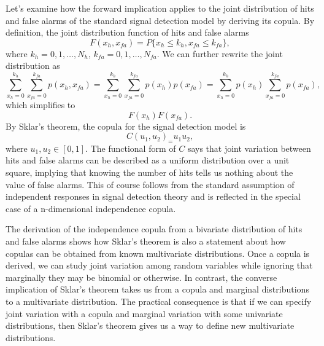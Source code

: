 \documentclass[12pt]{report}
\begin{document}
Let's examine how the forward implication applies to the joint distribution of hits and false alarms of the standard signal detection model by deriving its copula. By definition, the joint distribution function of hits and false alarms
\begin{equation}
F(x_h, x_{fa}) = P\{x_h \leq k_h, x_{fa} \leq k_{fa}\},
\end{equation}
where $k_h = 0, 1, \ldots, N_h$, $k_{fa} = 0, 1, \ldots, N_{fa}$. We can further rewrite the joint distribution as
\begin{equation}
\sum_{x_h = 0}^{k_h}\sum_{x_{fa} = 0}^{k_{fa}}p(x_h, x_{fa}) = 
\sum_{x_h = 0}^{k_h}\sum_{x_{fa} = 0}^{k_{fa}}p(x_h)p(x_{fa}) =
\sum_{x_h = 0}^{k_h}p(x_h)\sum_{x_{fa} = 0}^{k_{fa}}p(x_{fa}),
\end{equation}
which simplifies to
\begin{equation}
F(x_h)F(x_{fa}).
\end{equation}
By Sklar's theorem, the copula for the signal detection model is
\begin{equation}
C(u_1,u_2)_ = u_1 u_2,
\end{equation}
where $u_1,u_2 \in [0, 1]$. The functional form of $C$ says that joint variation between hits and false alarms can be described as a uniform distribution over a unit square, implying that knowing the number of hits tells us nothing about the value of false alarms. This of course follows from the standard assumption of independent responses in signal detection theory and is reflected in the special case of a n-dimensional independence copula.

The derivation of the independence copula from a bivariate distribution of hits and false alarms shows how Sklar's theorem is also a statement about how copulas can be obtained from known multivariate distributions. Once a copula is derived, we can study joint variation among random variables while ignoring that marginally they may be binomial or otherwise. In contrast, the converse implication of Sklar's theorem takes us from a copula and marginal distributions to a multivariate distribution.
The practical consequence is that if we can specify joint variation with a copula and marginal variation with some univariate distributions, then Sklar's theorem gives us a way to define new multivariate distributions. 
\end{document}

